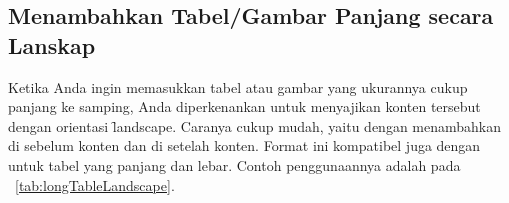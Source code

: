 \subsection{Menambahkan Tabel/Gambar Panjang secara Lanskap}
\label{sec:landscape}
Ketika Anda ingin memasukkan tabel atau gambar yang ukurannya cukup panjang ke samping, Anda diperkenankan untuk menyajikan konten tersebut dengan orientasi \f{landscape}.
Caranya cukup mudah, yaitu dengan menambahkan  di sebelum konten dan  di setelah konten.
Format ini kompatibel juga dengan  untuk tabel yang panjang dan lebar. Contoh penggunaannya adalah pada \tab~\ref{tab:longTableLandscape}.


